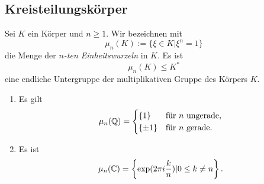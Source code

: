 \documentclass{book}
\begin{document}
\subsection{Kreisteilungskörper}%
\label{sub:kreisteilungskorper}

Sei $K$ ein Körper und $n \ge 1$. Wir bezeichnen mit 
\[
    \mu_n(K) := \{ \xi \in K | \xi^n = 1\}
\]
die Menge der {\em $n$-ten Einheitswurzeln} in $K$. Es ist
\[
    \mu_n(K) \le K^*
\]
eine endliche Untergruppe der multiplikativen Gruppe des Körpers $K$. 

\begin{exa}
    \label{exa:ewqc}
    \begin{enumerate}
        \item Es gilt
            \[
                \mu_n(\mathbb{Q}) = 
                \begin{cases} 
                    \{1\} & \text{für $n$ ungerade,}\\
                    \{ \pm 1 \} & \text{für $n$ gerade.} 
                \end{cases}
            \]
        \item Es ist
            \[
                \mu_n(\mathbb{C}) = \left\{ \exp(2 \pi i \frac{k}{n}) | 0 \le k \ne n \right\} .
            \]
    \end{enumerate}
\end{exa}
\end{document}
